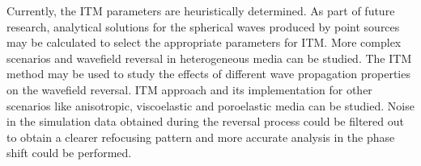 Currently, the \ac{ITM} parameters are heuristically determined. As part of future research, analytical solutions for the spherical waves produced by point sources may be calculated to select the appropriate parameters for \ac{ITM}. More complex scenarios and wavefield reversal in heterogeneous media can be studied. 
The \ac{ITM} method may be used to study the effects of different wave propagation properties on the wavefield reversal. \ac{ITM} approach and its implementation 
for other scenarios like anisotropic, viscoelastic and poroelastic media can be studied. Noise in the simulation data obtained during the reversal process
could be filtered out to obtain a clearer refocusing pattern and more accurate analysis in the phase shift could be performed.\\